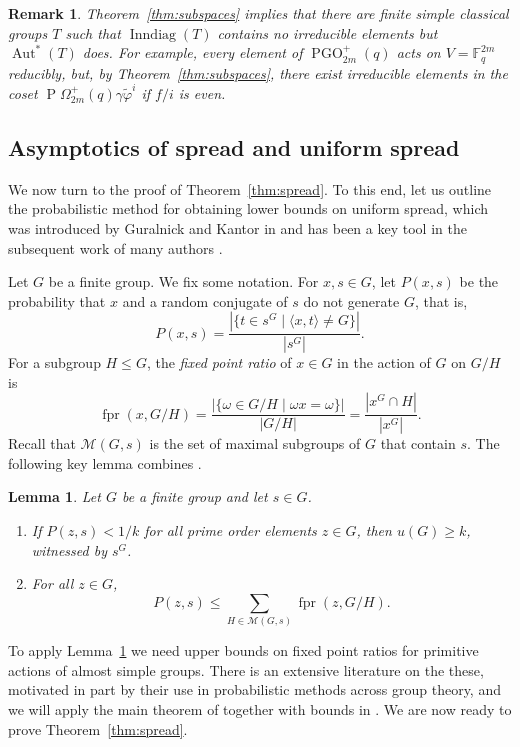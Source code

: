 \documentclass[11pt]{article}
\numberwithin{equation}{section}
\theoremstyle{shdefinition}
\newtheorem{remark}[definition]{Remark}
\theoremstyle{shplain}
\newtheorem{lemma}[definition]{Lemma}
\newcommand{\g}{\gamma}
\renewcommand{\wp}{\widetilde{\varphi}}
\newcommand{\M}{\mathcal{M}}
\newcommand{\<}{\langle}
\renewcommand{\>}{\rangle}
\renewcommand{\leq}{\leqslant}
\renewcommand{\geq}{\geqslant}
\newcommand{\Aut}{\operatorname{Aut}}
\newcommand{\Inndiag}{\operatorname{Inndiag}}
\newcommand{\fpr}{\operatorname{fpr}}
\newcommand{\F}{\mathbb{F}}
\renewcommand{\:}{\colon}
\newcommand{\Om}{\Omega}
\newcommand{\POm}{\operatorname{P}\!\Om}
\newcommand{\PGO}{\operatorname{PGO}}
\begin{document}
\begin{remark}
Theorem~\ref{thm:subspaces} implies that there are finite simple classical groups $T$ such that $\Inndiag(T)$ contains no irreducible elements but $\Aut^*(T)$ does. For example, every element of $\PGO^+_{2m}(q)$ acts on $V = \F_q^{2m}$ reducibly, but, by Theorem~\ref{thm:subspaces}, there exist irreducible elements in the coset $\POm^+_{2m}(q)\g\wp^i$ if $f/i$ is even.
\end{remark}


\subsection{Asymptotics of spread and uniform spread}

We now turn to the proof of Theorem~\ref{thm:spread}. To this end, let us outline the probabilistic method for obtaining lower bounds on uniform spread, which was introduced by Guralnick and Kantor in \cite{ref:GuralnickKantor00} and has been a key tool in the subsequent work of many authors \cite{ref:BreuerGuralnickKantor08,ref:BurnessGuest13,ref:BurnessGuralnickHarper,ref:Harper17,ref:Harper}.

Let $G$ be a finite group. We fix some notation. For $x,s \in G$, let $P(x,s)$ be the probability that $x$ and a random conjugate of $s$ do not generate $G$, that is, 
\[
P(x,s) = \frac{|\{t \in s^G \mid \< x, t \> \neq G \}|}{|s^G|}.
\]
For a subgroup $H \leq G$, the \emph{fixed point ratio} of $x \in G$ in the action of $G$ on $G/H$ is
\[
\fpr(x,G/H) = \frac{|\{ \omega \in G/H  \mid \omega x = \omega \}|}{|G/H|} = \frac{|x^G \cap H|}{|x^G|}.
\]
Recall that $\M(G,s)$ is the set of maximal subgroups of $G$ that contain $s$. The following key lemma combines \cite[Lemmas~2.1 and~2.2]{ref:BurnessGuest13}.

\begin{lemma} \label{lem:prob_method}
Let $G$ be a finite group and let $s \in G$.
\begin{enumerate}
\item If $P(z,s) < 1/k$ for all prime order elements $z \in G$, then $u(G) \geq k$, witnessed by $s^G$.
\item For all $z \in G$, 
\[ 
P(z,s) \leq \sum_{H \in \M(G,s)} \fpr(z,G/H).
\]
\end{enumerate}
\end{lemma}

To apply Lemma~\ref{lem:prob_method} we need upper bounds on fixed point ratios for primitive actions of almost simple groups. There is an extensive literature on the these, motivated in part by their use in probabilistic methods across group theory, and we will apply the main theorem of \cite{ref:Burness071,ref:Burness072,ref:Burness073,ref:Burness074} together with bounds in \cite{ref:GuralnickKantor00}. We are now ready to prove Theorem~\ref{thm:spread}.
\end{document}
